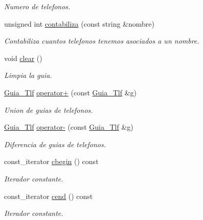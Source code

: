 \begin{DoxyCompactItemize}
\begin{DoxyCompactList}\small\item\em Numero de telefonos. \end{DoxyCompactList}\item 
unsigned int \hyperlink{classGuia__Tlf_aa63213524c6339ea89baae2b5d2ebb69}{contabiliza} (const string \&nombre)
\begin{DoxyCompactList}\small\item\em Contabiliza cuantos telefonos tenemos asociados a un nombre. \end{DoxyCompactList}\item 
\mbox{\label{classGuia__Tlf_a36ac970ece51a62763bb3898159d0047}} 
void \hyperlink{classGuia__Tlf_a36ac970ece51a62763bb3898159d0047}{clear} ()
\begin{DoxyCompactList}\small\item\em Limpia la guia. \end{DoxyCompactList}\item 
\hyperlink{classGuia__Tlf}{Guia\+\_\+\+Tlf} \hyperlink{classGuia__Tlf_a3e0b08a1985d3c72853690730319172f}{operator+} (const \hyperlink{classGuia__Tlf}{Guia\+\_\+\+Tlf} \&g)
\begin{DoxyCompactList}\small\item\em Union de guias de telefonos. \end{DoxyCompactList}\item 
\hyperlink{classGuia__Tlf}{Guia\+\_\+\+Tlf} \hyperlink{classGuia__Tlf_ac381d53f275ce769830e07fbc56902b0}{operator-\/} (const \hyperlink{classGuia__Tlf}{Guia\+\_\+\+Tlf} \&g)
\begin{DoxyCompactList}\small\item\em Diferencia de guias de telefonos. \end{DoxyCompactList}\item 
const\+\_\+iterator \hyperlink{classGuia__Tlf_a6fc1cd1e07ea139a5aec83882f73b3b4}{cbegin} () const
\begin{DoxyCompactList}\small\item\em Iterador constante. \end{DoxyCompactList}\item 
const\+\_\+iterator \hyperlink{classGuia__Tlf_afd2dd5c9f44f3c5b26d2475b7d9de04c}{cend} () const
\begin{DoxyCompactList}\small\item\em Iterador constante. \end{DoxyCompactList}\item 

\end{DoxyCompactItemize}
